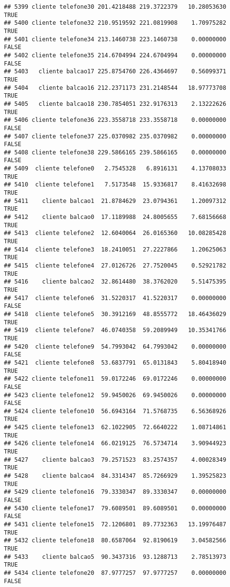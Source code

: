 \documentclass[
]{article}
\begin{document}
\begin{verbatim}
## 5399 cliente telefone30 201.4218488 219.3722379   10.28053630     TRUE
## 5400 cliente telefone32 210.9519592 221.0819908    1.70975282     TRUE
## 5401 cliente telefone34 213.1460738 223.1460738    0.00000000    FALSE
## 5402 cliente telefone35 214.6704994 224.6704994    0.00000000    FALSE
## 5403   cliente balcao17 225.8754760 226.4364697    0.56099371     TRUE
## 5404   cliente balcao16 212.2371173 231.2148544   18.97773708     TRUE
## 5405   cliente balcao18 230.7854051 232.9176313    2.13222626     TRUE
## 5406 cliente telefone36 223.3558718 233.3558718    0.00000000    FALSE
## 5407 cliente telefone37 225.0370982 235.0370982    0.00000000    FALSE
## 5408 cliente telefone38 229.5866165 239.5866165    0.00000000    FALSE
## 5409  cliente telefone0   2.7545328   6.8916131    4.13708033     TRUE
## 5410  cliente telefone1   7.5173548  15.9336817    8.41632698     TRUE
## 5411    cliente balcao1  21.8784629  23.0794361    1.20097312     TRUE
## 5412    cliente balcao0  17.1189988  24.8005655    7.68156668     TRUE
## 5413  cliente telefone2  12.6040064  26.0165360   10.08285428     TRUE
## 5414  cliente telefone3  18.2410051  27.2227866    1.20625063     TRUE
## 5415  cliente telefone4  27.0126726  27.7520045    0.52921782     TRUE
## 5416    cliente balcao2  32.8614480  38.3762020    5.51475395     TRUE
## 5417  cliente telefone6  31.5220317  41.5220317    0.00000000    FALSE
## 5418  cliente telefone5  30.3912169  48.8555772   18.46436029     TRUE
## 5419  cliente telefone7  46.0740358  59.2089949   10.35341766     TRUE
## 5420  cliente telefone9  54.7993042  64.7993042    0.00000000    FALSE
## 5421  cliente telefone8  53.6837791  65.0131843    5.80418940     TRUE
## 5422 cliente telefone11  59.0172246  69.0172246    0.00000000    FALSE
## 5423 cliente telefone12  59.9450026  69.9450026    0.00000000    FALSE
## 5424 cliente telefone10  56.6943164  71.5768735    6.56368926     TRUE
## 5425 cliente telefone13  62.1022905  72.6640222    1.08714861     TRUE
## 5426 cliente telefone14  66.0219125  76.5734714    3.90944923     TRUE
## 5427    cliente balcao3  79.2571523  83.2574357    4.00028349     TRUE
## 5428    cliente balcao4  84.3314347  85.7266929    1.39525823     TRUE
## 5429 cliente telefone16  79.3330347  89.3330347    0.00000000    FALSE
## 5430 cliente telefone17  79.6089501  89.6089501    0.00000000    FALSE
## 5431 cliente telefone15  72.1206801  89.7732363   13.19976487     TRUE
## 5432 cliente telefone18  80.6587064  92.8190619    3.04582566     TRUE
## 5433    cliente balcao5  90.3437316  93.1288713    2.78513973     TRUE
## 5434 cliente telefone20  87.9777257  97.9777257    0.00000000    FALSE

\end{verbatim}
\end{document}
